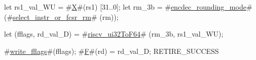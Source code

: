 let rs1_val_WU = #\hyperref[sailRISCVzX]{X}#(rs1) [31..0];
let rm_3b      = #\hyperref[sailRISCVzencdeczyroundingzymode]{encdec\_rounding\_mode}# (#\hyperref[sailRISCVzselectzyinstrzyorzyfcsrzyrm]{select\_instr\_or\_fcsr\_rm}#  (rm));

let (fflags, rd_val_D) = #\hyperref[sailRISCVzriscvzyui32ToF64]{riscv\_ui32ToF64}# (rm_3b, rs1_val_WU);

#\hyperref[sailRISCVzwritezyfflags]{write\_fflags}#(fflags);
#\hyperref[sailRISCVzF]{F}#(rd) = rd_val_D;
RETIRE_SUCCESS
